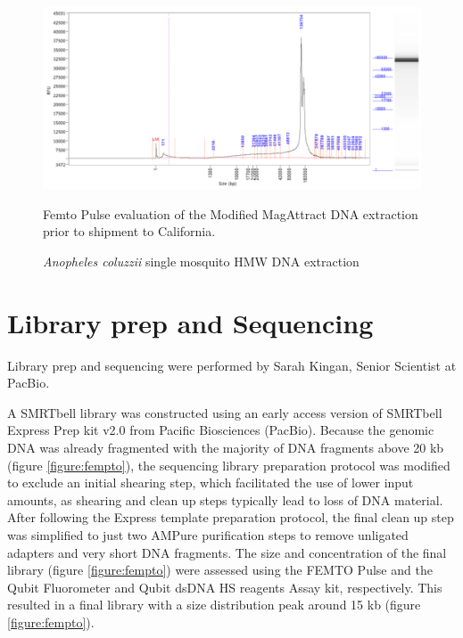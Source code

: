 \begin{figure}[htbp!]
\caption{\textit{Anopheles coluzzii} single mosquito HMW DNA extraction}
\label{figure:fempto2}
\begin{centering}
\includegraphics[width=.85\textwidth]{fempto2.png}
\par{ Femto Pulse evaluation of the Modified MagAttract DNA extraction prior to shipment to
California. }
\end{centering}
\end{figure}

\section{Library prep and Sequencing}

Library prep and sequencing were performed by Sarah Kingan, Senior Scientist at PacBio. \\

\par{
A SMRTbell library was constructed using an early access version of SMRTbell Express Prep kit v2.0 from Pacific Biosciences (PacBio). Because the genomic DNA was already fragmented with the majority of DNA fragments above 20 kb (figure \ref{figure:fempto}), the sequencing library preparation protocol was modified to exclude an initial shearing step, which facilitated the use of lower input amounts, as shearing and clean up steps typically lead to loss of DNA material. After following the Express template preparation protocol, the final clean up step was simplified to just two AMPure purification steps to remove unligated adapters and very short DNA fragments. The size and concentration of the final library (figure  \ref{figure:fempto}) were assessed using the FEMTO Pulse and the Qubit Fluorometer and Qubit dsDNA HS reagents Assay kit, respectively. This resulted in a final library with a size distribution peak around 15 kb (figure \ref{figure:fempto}). 
}


